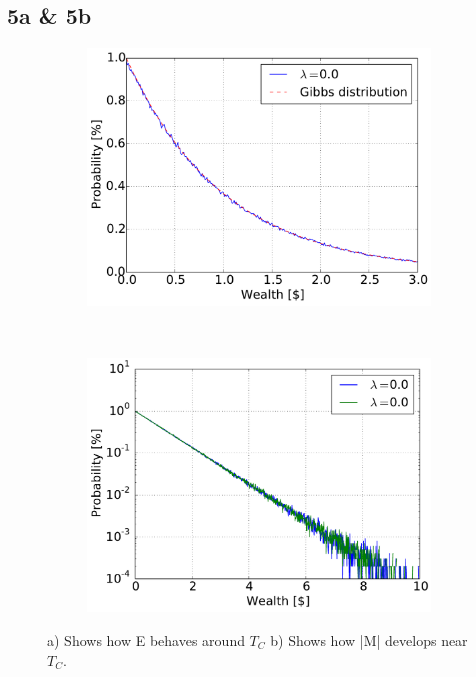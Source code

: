 \pagebreak
\subsection{5a \& 5b}
\begin{figure}[H]
    \centering
    \begin{subfigure}{0.5\textwidth}
        \centering
        \includegraphics[width=\linewidth]{result/bilder/5a-correct}
        \caption{}
    \end{subfigure}%
    ~ 
    \begin{subfigure}{0.5\textwidth}
        \centering
        \includegraphics[width=\linewidth]{result/bilder/5b-correct}
        \caption{}
    \end{subfigure}
    \caption{a) Shows how E behaves around $T_C$ b) Shows how |M| develops near $T_C$.}
    \label{fig:5a-b}
\end{figure}




























